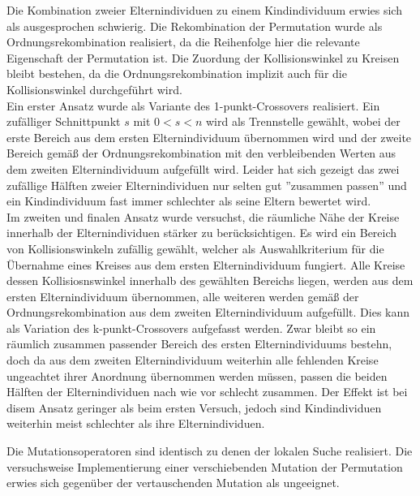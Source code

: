 \documentclass[twoside,bibtotoc]{report}
\begin{document}
\nsecend%



Die Kombination zweier Elternindividuen zu einem Kindindividuum erwies sich als ausgesprochen schwierig.
Die Rekombination der Permutation wurde als Ordnungsrekombination realisiert, da die Reihenfolge hier die relevante Eigenschaft der Permutation ist.
Die Zuordung der Kollisionswinkel zu Kreisen bleibt bestehen, da die Ordnungsrekombination implizit auch für die Kollisionswinkel durchgeführt wird.\\

Ein erster Ansatz wurde als Variante des 1-punkt-Crossovers realisiert.
Ein zufälliger Schnittpunkt $s$ mit $0 < s < n$ wird als Trennstelle gewählt, wobei der erste Bereich aus dem ersten Elternindividuum übernommen wird und der zweite Bereich gemäß der Ordnungsrekombination mit den verbleibenden Werten aus dem zweiten Elternindividuum aufgefüllt wird.
Leider hat sich gezeigt das zwei zufällige Hälften zweier Elternindividuen nur selten gut ''zusammen passen'' und ein Kindindividuum fast immer schlechter als seine Eltern bewertet wird.\\

Im zweiten und finalen Ansatz wurde versuchst, die räumliche Nähe der Kreise innerhalb der Elternindividuen stärker zu berücksichtigen.
Es wird ein Bereich von Kollisionswinkeln zufällig gewählt, welcher als Auswahlkriterium für die Übernahme eines Kreises aus dem ersten Elternindividuum fungiert.
Alle Kreise dessen Kollisiosnswinkel innerhalb des gewählten Bereichs liegen, werden aus dem ersten Elternindividuum übernommen, alle weiteren werden gemäß der Ordnungsrekombination aus dem zweiten Elternindividuum aufgefüllt.
Dies kann als Variation des k-punkt-Crossovers aufgefasst werden.
Zwar bleibt so ein räumlich zusammen passender Bereich des ersten Elternindividuums bestehn, doch da aus dem zweiten Elternindividuum weiterhin alle fehlenden Kreise ungeachtet ihrer Anordnung übernommen werden müssen, passen die beiden Hälften der Elternindividuen nach wie vor schlecht zusammen. Der Effekt ist bei disem Ansatz geringer als beim ersten Versuch, jedoch sind Kindindividuen weiterhin meist schlechter als ihre Elternindividuen.

\nsecend%


Die Mutationsoperatoren sind identisch zu denen der lokalen Suche realisiert. Die versuchsweise Implementierung einer verschiebenden Mutation der Permutation erwies sich gegenüber der vertauschenden Mutation als ungeeignet.
\end{document}
